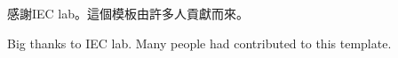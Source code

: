 \begin{acknowledgementszh}
    感謝IEC lab。這個模板由許多人貢獻而來。
\end{acknowledgementszh}

\begin{acknowledgementsen}
    Big thanks to IEC lab. Many people had contributed to this template.
\end{acknowledgementsen}
